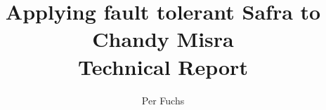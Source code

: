 \documentclass{article}
\title{Applying fault tolerant Safra to Chandy Misra \\
	\large Technical Report}
\author{Per Fuchs}
\begin{document}
	\maketitle
	
	
	
	
	
	
	
	\nocite{*}
	\printbibliography
\end{document}
